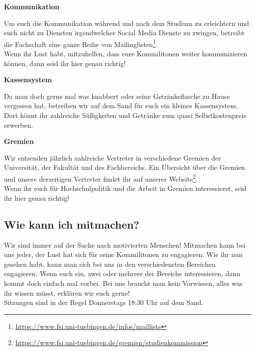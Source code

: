 \textbf{Kommunikation}

Um euch die Kommunikation während und nach dem Studium zu erleichtern und euch nicht zu Diensten irgendwelcher Social Media Dienste zu zwingen, betreibt die Fachschaft eine ganze Reihe von Mailinglisten\footnote{\url{https://www.fsi.uni-tuebingen.de/infos/maillists}}. \\	%
Wenn ihr Lust habt, mitzuhelfen, dass eure Kommilitonen weiter kommunizieren können, dann seid ihr hier genau richtig!

\textbf{Kassensystem}

Da man doch gerne mal was knabbert oder seine Getränkeflasche zu Hause vergessen hat, betreiben wir auf dem Sand für euch ein kleines Kassensystem. Dort könnt ihr zahlreiche Süßigkeiten und Getränke zum quasi Selbstkostenpreis erwerben. 

\textbf{Gremien}

Wir entsenden jährlich zahlreiche Vertreter in verschiedene Gremien der Universität, der Fakultät und des Fachbereichs. Ein Übersicht über die Gremien und unsere derzeitigen Vertreter findet ihr auf unserer Website\footnote{\url{https://www.fsi.uni-tuebingen.de/gremien/studienkommission}}. \\	%
Wenn ihr euch für Hochschulpolitik und die Arbeit in Gremien interessierst, seid ihr hier genau richtig!

%
\subsection{Wie kann ich mitmachen?}
Wir sind immer auf der Suche nach motivierten Menschen! Mitmachen kann bei uns jeder, der Lust hat sich für seine Kommilitonen zu engagieren. Wie ihr nun gesehen habt, kann man sich bei uns in den verschiedensten Bereichen engagieren. Wenn euch ein, zwei oder mehrere der Bereiche interessieren, dann kommt doch einfach mal vorbei. Bei uns braucht man kein Vorwissen, alles was ihr wissen müsst, erklären wir euch gerne!\\
Sitzungen sind in der Regel Donnerstags 18:30 Uhr auf dem Sand.


